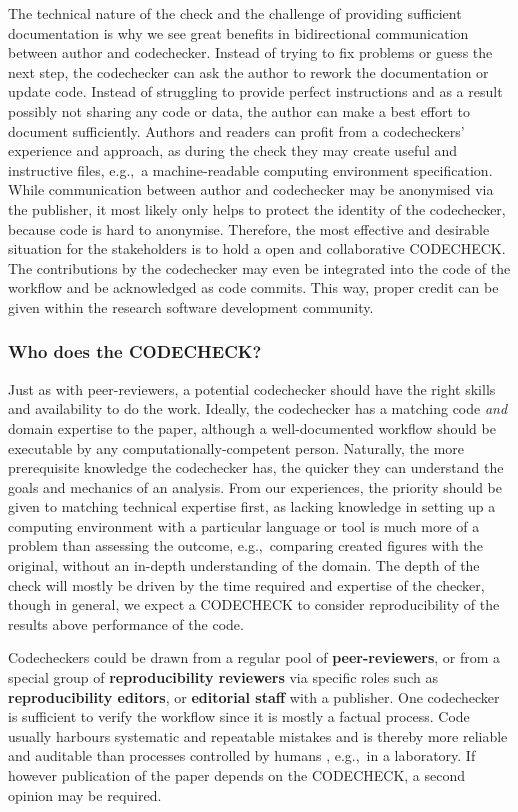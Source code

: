 \documentclass[12pt]{article}
\begin{document}
The technical nature of the check and the challenge of providing sufficient documentation is why we see great benefits in bidirectional communication between author and codechecker.
Instead of trying to
fix problems or guess the next step, the codechecker can ask the author to 
rework the documentation or update code.
Instead of struggling to provide perfect instructions and as a result possibly not sharing any code or data, the author can make a best effort to document sufficiently.
Authors and readers can profit from a codecheckers' experience and approach, as during the check they may create useful and instructive files, e.g.,~a machine-readable computing environment specification.
While communication between author and codechecker may be anonymised via
the publisher, it most likely only helps to protect the identity of
the codechecker, because code is hard to anonymise.
Therefore, the most effective and desirable situation for the
stakeholders is to hold a open and collaborative CODECHECK.
The contributions by the codechecker may even be integrated into
the code of the workflow and be acknowledged as code commits. This way, 
proper credit can be given within the research software development community.


\subsubsection*{Who does the CODECHECK?}\label{who-does-the-codecheck}

Just as with peer-reviewers, a potential codechecker should have the
right skills and availability to do the work.  Ideally, the
codechecker has a matching code \emph{and} domain expertise to the
paper, although a well-documented workflow should be executable by any
computationally-competent person. Naturally, the more
prerequisite knowledge the codechecker has, the quicker they can
understand the goals and mechanics of an analysis.  From our
experiences, the priority should be given to matching technical
expertise first, as lacking knowledge in setting up a computing
environment with a particular language or tool is much more of a
problem than assessing the outcome, e.g.,~comparing created figures
with the original, without an in-depth understanding of the domain.
The depth of the check will mostly be driven by the time required and
expertise of the checker, though in general, we expect a CODECHECK 
to consider reproducibility of the results above performance of the code.


Codecheckers could be drawn from a regular pool of
\textbf{peer-reviewers}, or from a special group of
\textbf{reproducibility reviewers} via specific roles such as
\textbf{reproducibility editors}, or \textbf{editorial staff} with a
publisher.  One codechecker is sufficient to verify the workflow since
it is mostly a factual process.  Code usually harbours systematic and
repeatable mistakes and is thereby more reliable and auditable than
processes controlled by humans \cite{tibav:42484}, e.g.,~in a
laboratory.  If however publication of the paper depends on the
CODECHECK, a second opinion may be required.
\end{document}
